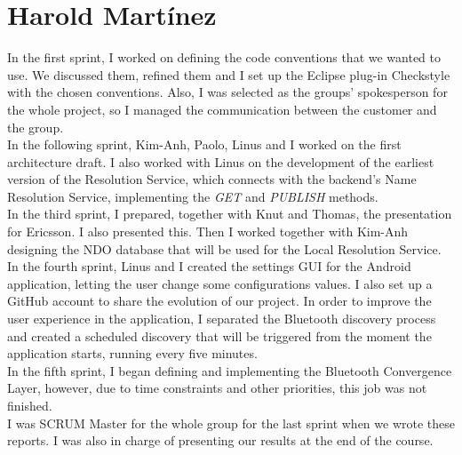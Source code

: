 \section{Harold Mart\'{i}nez}

In the first sprint, I worked on defining the code conventions that we wanted to use. 
We discussed them, refined them and I set up the Eclipse plug-in Checkstyle with the chosen conventions.
Also, I was selected as the groups' spokesperson for the whole project, so I managed the communication 
between the customer and the group.\\

In the following sprint, Kim-Anh, Paolo, Linus and I worked on the first architecture draft.
I also worked with Linus on the development of the earliest version of the Resolution Service, which connects with the 
backend's Name Resolution Service, implementing the \emph{GET} and \emph{PUBLISH} methods.\\

In the third sprint, I prepared, together with Knut and Thomas, the presentation for Ericsson. I also presented this. 
Then I worked together with Kim-Anh designing the NDO database that will be used for the 
Local Resolution Service.\\

In the fourth sprint, Linus and I created the settings GUI for the Android application, letting the user change 
some configurations values. I also set up a GitHub account to share the evolution of our project. In order to improve 
the user experience in the application, I separated the Bluetooth discovery process and created a scheduled discovery that 
will be triggered from the moment the application starts, running every five minutes.\\

In the fifth sprint, I began defining and implementing the Bluetooth Convergence Layer, however, due to time constraints 
and other priorities, this job was not finished. \\

I was SCRUM Master for the whole group for the last sprint when we wrote these reports. I was also in charge of presenting 
our results at the end of the course.\\

